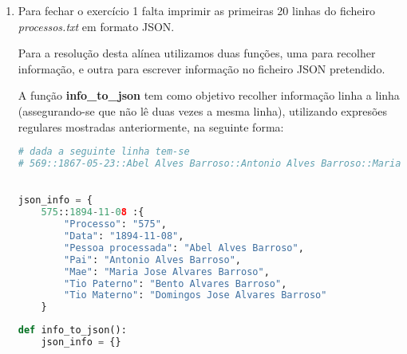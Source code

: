 \documentclass[11pt,a4paper]{report}
\begin{document}
\begin{enumerate}[label=\alph*.]
        \begin{lstlisting}[language=Python]
def relationFrequency():
    rel_freq = {}
    rel_freq["Progenitores"] = 0
    rel_freq["Filho"] = 0

    for line in lines:
        parents_and_son = re.findall(":([A-Za-z| ]+):", line)
    
        if parents_and_son:
            parents = parents_and_son[1:]
            rel_freq["Filho"] += 1
            rel_freq["Progenitores"] += len(parents)

        relations = re.findall("([A-Z][A-Za-z ]+),([A-Za-z ]+). ?(?i:(Proc.[0-9]+))", line)
        if relations:
            for relation in relations:
                if relation[1] not in rel_freq:
                    rel_freq[relation[1]] = 1
                else:
                    rel_freq[relation[1]] += 1

    return rel_freq
        \end{lstlisting}
    

    \item Para fechar o exercício 1 falta imprimir as primeiras 20 linhas do ficheiro \textit{processos.txt} em formato JSON.
    
    Para a resolução desta alínea utilizamos duas funções, uma para recolher informação, e outra para escrever informação no ficheiro JSON pretendido.

    A função \textbf{info\_to\_json} tem como objetivo recolher informação linha a linha (assegurando-se que não lê duas vezes a mesma linha), utilizando expresões regulares mostradas anteriormente, na seguinte forma:

        \begin{lstlisting}[language=Python]
# dada a seguinte linha tem-se
# 569::1867-05-23::Abel Alves Barroso::Antonio Alves Barroso::Maria Jose Alvares Barroso::Bento Alvares Barroso,Tio Paterno. Proc.32057.   Domingos Jose Alvares Barroso,Tio Materno. Proc.32235.::

    
json_info = { 
    575::1894-11-08 :{
        "Processo": "575",
        "Data": "1894-11-08",
        "Pessoa processada": "Abel Alves Barroso",
        "Pai": "Antonio Alves Barroso",
        "Mae": "Maria Jose Alvares Barroso",
        "Tio Paterno": "Bento Alvares Barroso",
        "Tio Materno": "Domingos Jose Alvares Barroso"
    }
        \end{lstlisting}

        \begin{lstlisting}[language=Python]
def info_to_json():
    json_info = {}


\end{lstlisting}
\end{enumerate}
\end{document}
